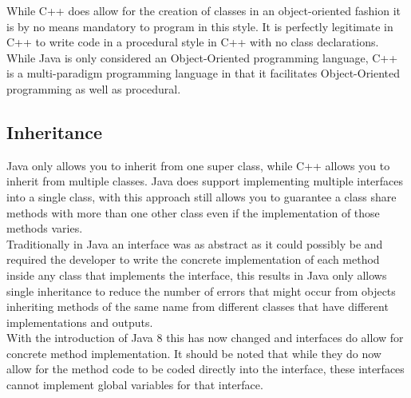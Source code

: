 \documentclass[11pt]{article}  %
\theoremstyle{definition}
\theoremstyle{remark}
\begin{document}
While C++ does allow for the creation of classes in an object-oriented fashion it is by no means mandatory to program in this style. It is perfectly legitimate in C++ to write code in a procedural style in C++ with no class declarations. While Java is only considered an Object-Oriented programming language, C++ is a multi-paradigm programming language in that it facilitates Object-Oriented programming as well as procedural. 

\subsection{Inheritance}\label{ss:back}

Java only allows you to inherit from one super class, while C++ allows you to inherit from multiple classes. Java does support implementing multiple interfaces into a single class, with this approach still allows you to guarantee a class share methods with more than one other class even if the implementation of those methods varies.\\

Traditionally in Java an interface was as abstract as it could possibly be and required the developer to write the concrete implementation of each method inside any class that implements the interface, this results in Java only allows single inheritance to reduce the number of errors that might occur from objects inheriting methods of the same name from different classes that have different implementations and outputs.\\


With the introduction of Java 8 this has now changed and interfaces do allow for concrete method implementation. It should be noted that while they do now allow for the method code to be coded directly into the interface, these interfaces cannot implement global variables for that interface. 
\end{document}
